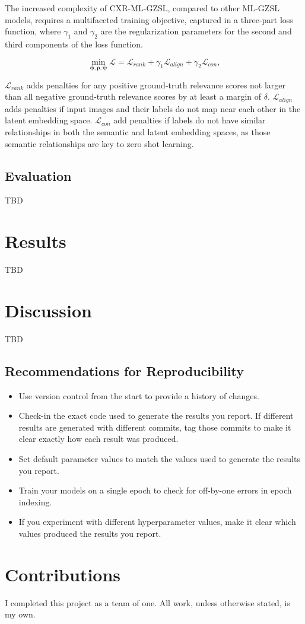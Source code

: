 \documentclass[letterpaper]{article} %
\begin{document}
The increased complexity of CXR-ML-GZSL, compared to other ML-GZSL models, requires a multifaceted training objective, captured in a three-part loss function, where $\gamma_1$ and $\gamma_2$ are the regularization parameters for the second and third components of the loss function.

\begin{equation}
    \min_{\boldsymbol{\phi} ,\boldsymbol{\rho} ,\boldsymbol{\psi}} \mathcal{L} = \mathcal{L}_{{rank}} +\gamma_{1} \mathcal{L}_{align} +\gamma_{2} \mathcal{L}_{con},
    \label{eqn:full_loss}
\end{equation}

\texorpdfstring{$\mathcal{L}_{rank}$}: adds penalties for any positive ground-truth relevance scores not larger than all negative ground-truth relevance scores by at least a margin of $\delta$. \texorpdfstring{$\mathcal{L}_{align}$}: adds penalties if input images and their labels do not map near each other in the latent embedding space. \texorpdfstring{$\mathcal{L}_{con}$}: add penalties if labels do not have similar relationships in both the semantic and latent embedding spaces, as those semantic relationships are key to zero shot learning.

\subsection{Evaluation}

TBD

\section{Results}

TBD

\section{Discussion}

TBD

\subsection{Recommendations for Reproducibility}

\begin{itemize}
    \item Use version control from the start to provide a history of changes.
    \item Check-in the exact code used to generate the results you report. If different results are generated with different commits, tag those commits to make it clear exactly how each result was produced.
    \item Set default parameter values to match the values used to generate the results you report.
    \item Train your models on a single epoch to check for off-by-one errors in epoch indexing.
    \item If you experiment with different hyperparameter values, make it clear which values produced the results you report.
\end{itemize}

\section{Contributions}

I completed this project as a team of one. All work, unless otherwise stated, is my own.


\end{document}
